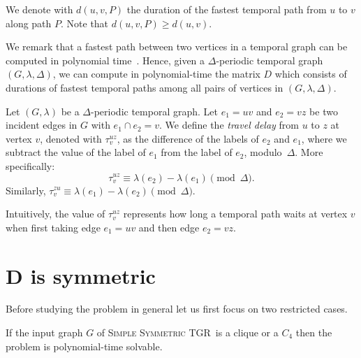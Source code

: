 \documentclass[a4paper,UKenglish,cleveref, autoref, thm-restate]{lipics-v2021}
\newcommand{\deltaSymExact}{\textsc{Simple Symmetric TGR}}
\begin{document}
We denote with $d(u,v,P)$ the duration of the fastest temporal path from $u$ to $v$ along path $P$. Note that $d(u,v,P) \geq d(u,v)$.

We remark that a fastest path between two vertices in a temporal graph can be computed in polynomial time~\cite{xuan_computing_2003,Wu2016Efficient}.
Hence, given a $\Delta$-periodic temporal graph $(G,\lambda,\Delta)$, we can compute in polynomial-time  the matrix $D$
which consists of durations of fastest temporal paths among all pairs of vertices in $(G,\lambda,\Delta)$.


\begin{definition}
	Let $(G, \lambda)$ be a $\Delta$-periodic temporal graph.
	Let $e_1=uv$ and $e_2=vz$ be two incident edges in $G$ with $e_1 \cap e_2 = v$.
	We define the \emph{travel delay} from $u$ to $z$ at vertex $v$, denoted with $\tau_v^{uz}$,
	as the difference of the labels of $e_2$ and $e_1$, where we subtract the value of the label of $e_1$ from the label of $e_2$,  modulo~$\Delta$.
	More specifically:
	\begin{equation}\label{eq:def-VertexWaitingTime}
		\tau_v^{uz} \equiv \lambda (e_2) - \lambda(e_1) \pmod \Delta.
	\end{equation}
	Similarly, $\tau_v^{zu} \equiv \lambda (e_1) - \lambda(e_2) \pmod \Delta$.
\end{definition}
Intuitively, the value of $\tau_v^{uz}$ represents how long a temporal path waits at vertex $v$ when first taking edge $e_1=uv$ and then edge $e_2 = vz$.





\section{D is symmetric}
Before studying the problem in general let us first focus on two restricted cases.
\begin{theorem}
	If the input graph $G$ of \deltaSymExact\ is a clique or a $C_4$ then the problem is polynomial-time solvable. 
\end{theorem}
\end{document}
